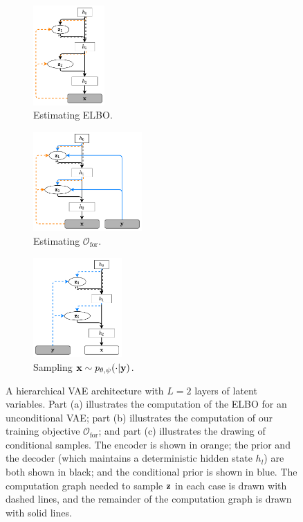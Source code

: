 \begin{figure}[t]
  \centering
  \begin{subfigure}[b]{.32\textwidth}
    \centering
    \includegraphics[height=3.8cm]{figs/cigcvae/arch_small-standard.pdf}
    \caption{Estimating ELBO.}
    \label{fig:cigcvae-hierarchical-vae}
  \end{subfigure}
  \begin{subfigure}[b]{.32\textwidth}
    \centering
    \includegraphics[height=3.8cm]{figs/cigcvae/arch_small-forward.pdf}
    \caption{Estimating $\mathcal{O}_\mathrm{for}$.}
    \label{fig:cigcvae-forward-arch}
  \end{subfigure}
  \begin{subfigure}[b]{.32\textwidth}
    \centering
    \includegraphics[height=3.8cm]{figs/cigcvae/arch_small-sampling.pdf}
    \caption{Sampling ${\mathbf{x}}\sim p_{\theta,\psi}(\cdot|{\mathbf{y}})$.}
    \label{fig:cigcvae-reverse-arch}
  \end{subfigure}
  \vspace{-1mm}
  \caption{A hierarchical VAE architecture with $L=2$ layers of latent
    variables. Part (a) illustrates the computation of the ELBO for an
    unconditional VAE; part (b) illustrates the computation of our training
    objective $\mathcal{O}_\mathrm{for}$; and part (c) illustrates the drawing
    of conditional samples. The encoder is shown in orange; the prior and the
    decoder (which maintains a deterministic hidden state $h_{l}$) are both
    shown in black; and the conditional prior is shown in blue. The computation
    graph needed to sample ${\mathbf{z}}$ in each case is drawn with dashed lines, and
    the remainder of the computation graph is drawn with solid lines.}
  \label{fig:cigcvae-conditional-architectures}
  \vspace{-2mm}
\end{figure}

